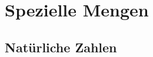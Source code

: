 \documentclass[../../main.tex]{subfiles}
\begin{document}
	
	\chapter{Spezielle Mengen}
	
		\section{Natürliche Zahlen}
		
		
	
\end{document}
